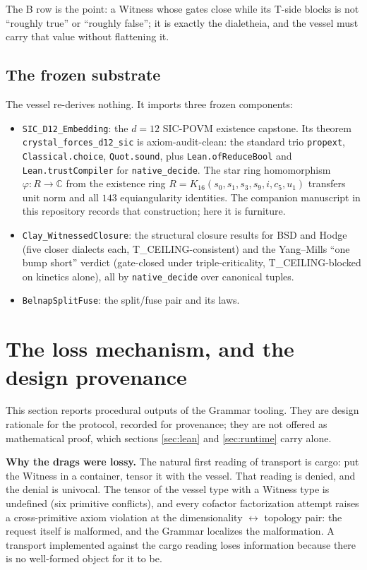 \documentclass[12pt,a4paper]{article}
\newcommand{\bB}{\textsf{B}}
\begin{document}
The \bB{} row is the point: a Witness whose gates close while its T-side
blocks is not ``roughly true'' or ``roughly false''; it is exactly the
dialetheia, and the vessel must carry that value without flattening it.

\subsection{The frozen substrate}

The vessel re-derives nothing. It imports three frozen components:
\begin{itemize}
\item \texttt{SIC\_D12\_Embedding}: the $d = 12$ SIC-POVM existence
capstone. Its theorem \texttt{crystal\_forces\_d12\_sic} is
axiom-audit-clean: the standard trio \texttt{propext},
\texttt{Classical.choice}, \texttt{Quot.sound}, plus
\texttt{Lean.ofReduceBool} and \texttt{Lean.trustCompiler} for
\texttt{native\_decide}. The star ring homomorphism
$\varphi : R \to \mathbb{C}$ from the existence ring
$R = K_{16}(s_0,s_1,s_3,s_9,i,c_5,u_1)$ transfers unit norm and all
$143$ equiangularity identities. The companion manuscript in this
repository records that construction; here it is furniture.
\item \texttt{Clay\_WitnessedClosure}: the structural closure results for
BSD and Hodge (five closer dialects each, T\_CEILING-consistent) and the
Yang--Mills ``one bump short'' verdict (gate-closed under
triple-criticality, T\_CEILING-blocked on kinetics alone), all by
\texttt{native\_decide} over canonical tuples.
\item \texttt{BelnapSplitFuse}: the split/fuse pair and its laws.
\end{itemize}

\section{The loss mechanism, and the design provenance}
\label{sec:provenance}

This section reports procedural outputs of the Grammar tooling. They are
design rationale for the protocol, recorded for provenance; they are not
offered as mathematical proof, which sections \ref{sec:lean} and
\ref{sec:runtime} carry alone.

\textbf{Why the drags were lossy.} The natural first reading of transport
is cargo: put the Witness in a container, tensor it with the vessel. That
reading is denied, and the denial is univocal. The tensor of the vessel
type with a Witness type is undefined (six primitive conflicts), and every
cofactor factorization attempt raises a cross-primitive axiom violation at
the dimensionality $\leftrightarrow$ topology pair: the request itself is
malformed, and the Grammar localizes the malformation. A transport
implemented against the cargo reading loses information because there is no
well-formed object for it to be.
\end{document}

